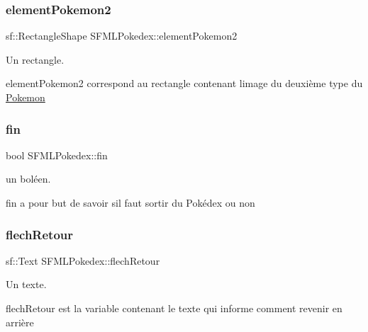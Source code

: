 \subsubsection{\texorpdfstring{element\+Pokemon2}{elementPokemon2}}
{\footnotesize\ttfamily sf\+::\+Rectangle\+Shape S\+F\+M\+L\+Pokedex\+::element\+Pokemon2\hspace{0.3cm}{\ttfamily [private]}}



Un rectangle. 

element\+Pokemon2 correspond au rectangle contenant l\textquotesingle{}image du deuxième type du \hyperlink{class_pokemon}{Pokemon} \mbox{\label{class_s_f_m_l_pokedex_a773410b0979da4ed7a7792b80b0a7a99}} 
\subsubsection{\texorpdfstring{fin}{fin}}
{\footnotesize\ttfamily bool S\+F\+M\+L\+Pokedex\+::fin\hspace{0.3cm}{\ttfamily [private]}}



un boléen. 

fin a pour but de savoir s\textquotesingle{}il faut sortir du Pokédex ou non \mbox{\label{class_s_f_m_l_pokedex_a68eca06ace0197ee2f3c2df95ebc38f7}} 
\subsubsection{\texorpdfstring{flech\+Retour}{flechRetour}}
{\footnotesize\ttfamily sf\+::\+Text S\+F\+M\+L\+Pokedex\+::flech\+Retour\hspace{0.3cm}{\ttfamily [private]}}



Un texte. 

flech\+Retour est la variable contenant le texte qui informe comment revenir en arrière \mbox{\label{class_s_f_m_l_pokedex_a8f77186aadf9a6ff658ab2e2dfb3fe8e}} 
